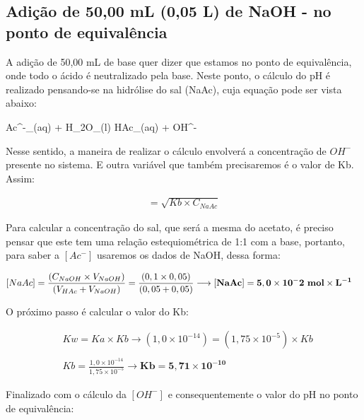 \documentclass[a4paper, 12pt]{report}
\begin{document}
\subsection{Adição de 50,00 mL (0,05 L) de NaOH - no ponto de equivalência}
A adição de 50,00 mL de base quer dizer que estamos no ponto de equivalência, onde todo o ácido é neutralizado pela base. Neste ponto, o cálculo do pH é realizado pensando-se na hidrólise do sal (NaAc), cuja equação pode ser vista abaixo:

\begin{chemeqn}
	Ac^{-}_{(aq)} + H_{2}O_{(l)} \equilibarrow HAc_{(aq)} + OH^-{} 
\end{chemeqn}

Nesse sentido, a maneira de realizar o cálculo envolverá a concentração de $OH^{-}$ presente no sistema. E outra variável que também precisaremos é o valor de Kb. Assim:

\begin{fleqn}
	\begin{align*}
		[OH^{-}] = \sqrt{Kb \times C_{NaAc}}
	\end{align*}
\end{fleqn}

Para calcular a concentração do sal, que será a mesma do acetato, é preciso pensar que este tem uma relação estequiométrica de 1:1 com a base, portanto, para saber a $[Ac^{-}]$ usaremos os dados de NaOH, dessa forma:

\begin{fleqn}
	\begin{align*}
		&[NaAc] = \frac{ (C_{NaOH} \times V_{NaOH}) }{ (V_{HAc} + V_{NaOH}) } = \frac{ (0,1 \times 0,05) }{ (0,05 + 0,05) } \longrightarrow	 \mathbf{[NaAc] = 5,0 \times 10^-2 \text{ \textbf{mol}} \times L^{-1}}
	\end{align*}
\end{fleqn}

O próximo passo é calcular o valor do Kb: 

\begin{fleqn}
	\begin{align*}
		&Kw = Ka \times Kb \longrightarrow	 (1,0 \times 10^{-14}) = (1,75 \times 10^{-5}) \times Kb \\ \\
		&Kb = \frac{1,0 \times 10^{-14}}{1,75 \times 10^{-5}} \longrightarrow	 \mathbf{Kb = 5,71 \times 10^{-10}}
	\end{align*}
\end{fleqn}

Finalizado com o cálculo da $[OH^{-}]$ e consequentemente o valor do pH no ponto de equivalência:
\end{document}
